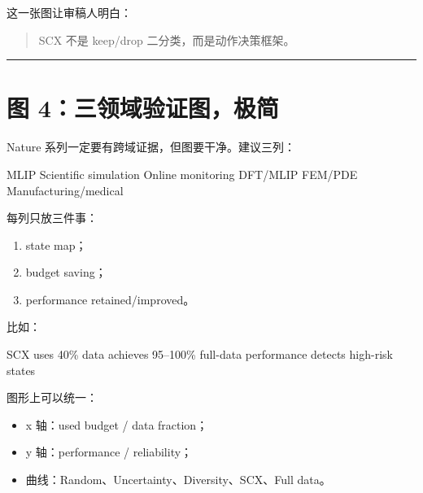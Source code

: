 \documentclass[
  12pt,
]{ctexart}
\newenvironment{Shaded}{}{}
\newcommand{\NormalTok}[1]{#1}
\providecommand{\tightlist}{%
  \setlength{\itemsep}{0pt}\setlength{\parskip}{0pt}}
\begin{document}
这一张图让审稿人明白：

\begin{quote}
SCX 不是 keep/drop 二分类，而是动作决策框架。
\end{quote}

\begin{center}\rule{0.5\linewidth}{0.5pt}\end{center}

\section{图
4：三领域验证图，极简}\label{ux56fe-4ux4e09ux9886ux57dfux9a8cux8bc1ux56feux6781ux7b80}

Nature 系列一定要有跨域证据，但图要干净。建议三列：

\begin{Shaded}
\begin{Highlighting}[]
\NormalTok{MLIP                 Scientific simulation       Online monitoring}
\NormalTok{DFT/MLIP             FEM/PDE                     Manufacturing/medical}
\end{Highlighting}
\end{Shaded}

每列只放三件事：

\begin{enumerate}
\def\labelenumi{\arabic{enumi}.}
\tightlist
\item
  state map；
\item
  budget saving；
\item
  performance retained/improved。
\end{enumerate}

比如：

\begin{Shaded}
\begin{Highlighting}[]
\NormalTok{SCX uses 40\% data}
\NormalTok{achieves 95–100\% full{-}data performance}
\NormalTok{detects high{-}risk states}
\end{Highlighting}
\end{Shaded}

图形上可以统一：

\begin{itemize}
\tightlist
\item
  x 轴：used budget / data fraction；
\item
  y 轴：performance / reliability；
\item
  曲线：Random、Uncertainty、Diversity、SCX、Full data。
\end{itemize}
\end{document}
